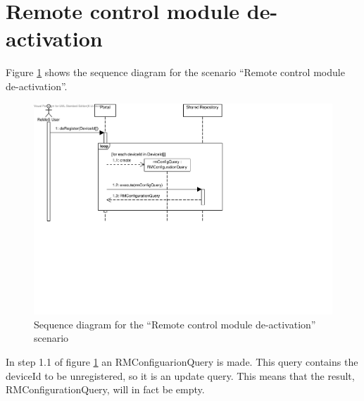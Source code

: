 \section{Remote control module de-activation}

\npar Figure \ref{fig:scenario-5-12} shows the sequence diagram for the scenario
``Remote control module de-activation''.

\begin{figure}[H]
	\begin{centering}
		\includegraphics[width=\textwidth]{figs/scenario-5-12.pdf}
		\caption{Sequence diagram for the ``Remote control module de-activation''
		scenario}
		\label{fig:scenario-5-12}
	\end{centering}
\end{figure}

\npar In step 1.1 of figure \ref{fig:scenario-5-12} an RMConfiguarionQuery is
made. This query contains the deviceId to be unregistered, so it is an
update query. This means that the result, RMConfigurationQuery, will in fact be
empty.
